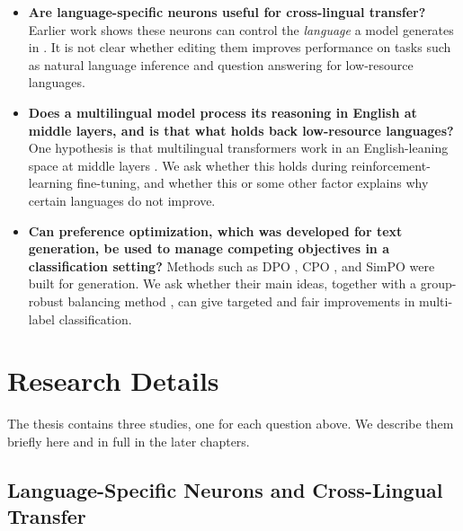 \begin{itemize}
	\item \textbf{Are language-specific neurons useful for cross-lingual
		transfer?} Earlier work shows these neurons can control the \emph{language} a
	model generates in \citep{tang2024language, kojima2024multilingual}. It is not
	clear whether editing them improves performance on tasks such as natural
	language inference \citep{conneau2018xnli} and question answering
	\citep{artetxe2020cross} for low-resource languages.
	
	\item \textbf{Does a multilingual model process its reasoning in English at
		middle layers, and is that what holds back low-resource languages?} One
	hypothesis is that multilingual transformers work in an English-leaning space
	at middle layers \citep{wendler2024llamas}. We ask whether this holds during
	reinforcement-learning fine-tuning, and whether this or some other factor
	explains why certain languages do not improve.
	
	\item \textbf{Can preference optimization, which was developed for text
		generation, be used to manage competing objectives in a classification
		setting?} Methods such as DPO \citep{rafailov2023direct}, CPO
	\citep{xu2024contrastive}, and SimPO \citep{meng2024simpo} were built for
	generation. We ask whether their main ideas, together with a group-robust
	balancing method \citep{ramesh2024group}, can give targeted and fair
	improvements in multi-label classification.
\end{itemize}

\section{Research Details}
\label{sec:intro-details}

The thesis contains three studies, one for each question above. We describe them
briefly here and in full in the later chapters.

\subsection{Language-Specific Neurons and Cross-Lingual Transfer}
\label{sec:intro-neurons}

